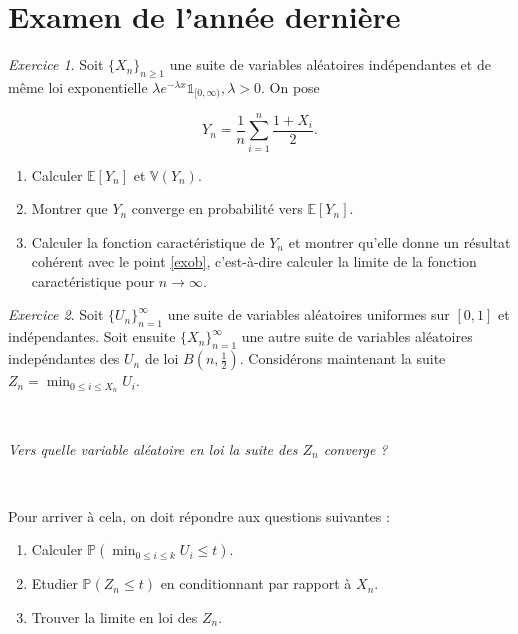 \documentclass[french]{book}
\theoremstyle{definition}
\theoremstyle{remark}
\newtheorem{exo}{Exercice}
\newcommand{\biggg}{>}
\newcommand{\bg}{\biggg}
\begin{document}
\section*{Examen de l'année dernière}

\begin{exo}
  Soit \(\{ X_n \}_{n \geq 1}\) une suite de variables aléatoires indépendantes et de même loi exponentielle \(\lambda e^{-\lambda x} \mathds{1}_{[0,\infty)}, \lambda \bg 0\). On pose

  \[Y_n = \frac{1}{n}\sum_{i=1}^{n} \frac{1 + X_i}{2}.\]

  \begin{enumerate}
    \item Calculer \(\mathbb{E}[Y_n]\) et \(\mathbb{V}(Y_n)\).
    \item \label{exob} Montrer que \(Y_n\) converge en probabilité vers \(\mathbb{E}[Y_n]\).
    \item Calculer la fonction caractéristique de \(Y_n\) et montrer qu'elle donne un résultat cohérent avec le point \ref{exob}, c'est-à-dire calculer la limite de la fonction caractéristique pour \(n \longrightarrow \infty\).
  \end{enumerate}
\end{exo}

\begin{exo}
  Soit \(\{ U_n \}_{n=1}^{\infty}\) une suite de variables aléatoires uniformes sur \([0, 1]\) et indépendantes. Soit ensuite \(\{ X_n \}_{n=1}^{\infty}\) une autre suite de variables aléatoires indepéndantes des \(U_n\) de loi \(B(n, \frac{1}{2})\). Considérons maintenant la suite \(Z_n = \displaystyle\min _{0 \leq i \leq X_n} U_i\).

  \

  \emph{Vers quelle variable aléatoire en loi la suite des \(Z_n\) converge ?}

  \

  Pour arriver à cela, on doit répondre aux questions suivantes :

  \begin{enumerate}
    \item Calculer \(\mathbb{P}(\displaystyle\min _{0 \leq  i \leq k} U_i \leq t)\).
    \item Etudier \(\mathbb{P}(Z_n \leq t)\) en conditionnant par rapport à \(X_n\).
    \item Trouver la limite en loi des \(Z_n\).
  \end{enumerate}
\end{exo}
\end{document}
